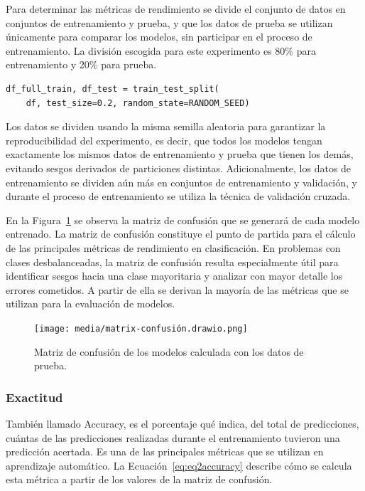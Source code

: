 \documentclass[11pt,a4paper,spanish]{book}
\numberwithin{equation}{chapter}
\numberwithin{figure}{chapter}
\begin{document}
Para determinar las métricas de rendimiento se divide el conjunto de datos en conjuntos 
de entrenamiento y prueba, y que los datos de prueba se utilizan únicamente para 
comparar los modelos, sin participar en el proceso de entrenamiento. La división 
escogida para este experimento es 80\% para entrenamiento y 20\% para prueba. 


\vspace{5mm}
\begin{lstlisting}
df_full_train, df_test = train_test_split(
    df, test_size=0.2, random_state=RANDOM_SEED)
\end{lstlisting}


Los datos se dividen usando la misma semilla aleatoria para garantizar la 
reproducibilidad del experimento, es decir, que todos los modelos tengan exactamente 
los mismos datos de entrenamiento y prueba que tienen los demás, evitando sesgos 
derivados de particiones distintas. Adicionalmente, los datos de entrenamiento se 
dividen aún más en conjuntos de entrenamiento y validación, y durante el proceso de 
entrenamiento se utiliza la técnica de validación cruzada. 


En la Figura~\ref{fig:figMatrixConfusion} se observa la matriz de confusión que se generará 
de cada modelo entrenado. 
La matriz de confusión constituye el punto de partida para el cálculo de las principales 
métricas de rendimiento en clasificación. En problemas con clases desbalanceadas, la 
matriz de confusión resulta especialmente útil para identificar sesgos hacia una clase 
mayoritaria y analizar con mayor detalle los errores cometidos. A partir de ella se 
derivan la mayoría de las métricas que se utilizan para la evaluación de modelos. 


\begin{figure}[H]
    \caption{Matriz de confusión de los modelos calculada con los datos de prueba.}
    \centering
    \texttt{[image: media/matrix-confusión.drawio.png]}
    \label{fig:figMatrixConfusion}
\end{figure}


\subsubsection{Exactitud}

También llamado Accuracy, es el porcentaje qué indica, del total de predicciones, 
cuántas de las predicciones realizadas durante el entrenamiento tuvieron una predicción 
acertada. Es una de las principales métricas que se utilizan en aprendizaje automático. 
La Ecuación~\eqref{eq:eq2accuracy} describe cómo se calcula esta métrica a partir de 
los valores de la matriz de confusión. 
\end{document}
